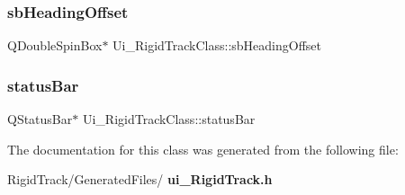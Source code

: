 \subsubsection{sb\+Heading\+Offset}
{\footnotesize\ttfamily Q\+Double\+Spin\+Box$\ast$ Ui\+\_\+\+Rigid\+Track\+Class\+::sb\+Heading\+Offset}

\mbox{\label{class_ui___rigid_track_class_ac1ced4ae725bc0095307704d5d4fc4f2}} 
\subsubsection{status\+Bar}
{\footnotesize\ttfamily Q\+Status\+Bar$\ast$ Ui\+\_\+\+Rigid\+Track\+Class\+::status\+Bar}



The documentation for this class was generated from the following file\+:\begin{DoxyCompactItemize}
\item 
Rigid\+Track/\+Generated\+Files/\textbf{ ui\+\_\+\+Rigid\+Track.\+h}\end{DoxyCompactItemize}
